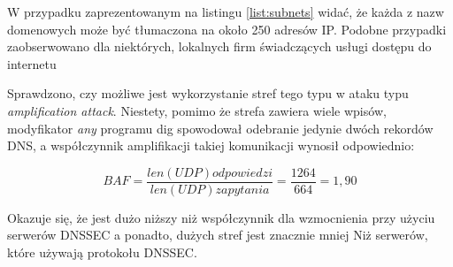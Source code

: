 W przypadku zaprezentowanym na listingu \ref{list:subnets} widać, że każda z nazw domenowych może być tłumaczona na około 250 adresów
IP. Podobne przypadki zaobserwowano dla niektórych, lokalnych firm świadczących usługi dostępu do internetu

Sprawdzono, czy możliwe jest wykorzystanie stref tego typu w ataku typu \textit{amplification attack}. Niestety, pomimo że strefa
zawiera wiele wpisów, modyfikator \textit{any} programu dig spowodował odebranie jedynie dwóch rekordów DNS, a współczynnik
amplifikacji takiej komunikacji wynosił odpowiednio:

$$ BAF=\frac{len(UDP) odpowiedzi}{len(UDP) zapytania}=\frac{1264}{664}=1,90 $$

Okazuje się, że jest dużo niższy niż współczynnik dla wzmocnienia przy użyciu serwerów DNSSEC a ponadto, dużych stref jest znacznie mniej
Niż serwerów, które używają protokołu DNSSEC.
